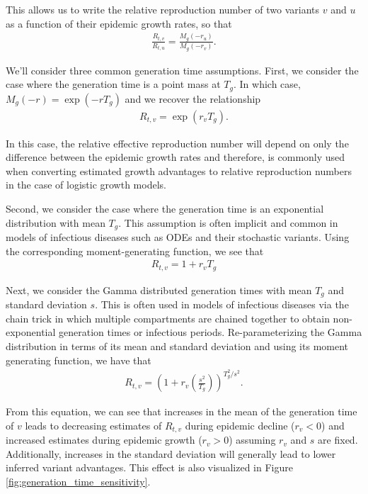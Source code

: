 \documentclass[11pt,oneside,letterpaper]{article}
\begin{document}
This allows us to write the relative reproduction number of two variants $v$ and $u$ as a function of their epidemic growth rates, so that
\begin{align*}
\frac{R_{t,v}}{R_{t,u}} = \frac{M_{g}(-r_{u})}{M_{g}(-r_{v})}.
\end{align*}

We'll consider three common generation time assumptions. First, we consider the case where the generation time is a point mass at $T_{g}$. In which case, $M_{g}(-r) = \exp(-r T_{g})$ and we recover the relationship
\begin{align*}
R_{t,v} = \exp(r_{v}T_{g}).
\end{align*}

In this case, the relative effective reproduction number will depend on only the difference between the epidemic growth rates and therefore, is commonly used when converting estimated growth advantages to relative reproduction numbers in the case of logistic growth models.

Second, we consider the case where the generation time is an exponential distribution with mean $T_{g}$. This assumption is often implicit and common in models of infectious diseases such as ODEs and their stochastic variants. Using the corresponding moment-generating function, we see that
\begin{align*}
R_{t,v} = 1 + r_{v} T_{g}
\end{align*}

Next, we consider the Gamma distributed generation times with mean $T_{g}$ and standard deviation $s$.
This is often used in models of infectious diseases via the chain trick in which multiple compartments are chained together to obtain non-exponential generation times or infectious periods.
Re-parameterizing the Gamma distribution in terms of its mean and standard deviation and using its moment generating function, we have that
\begin{align*}
R_{t,v} = \left(1 + r_{v}  \left(\frac{s^{2}}{T_{g}}\right) \right)^{T_{g}^{2} / s^{2}}.
\end{align*}

From this equation, we can see that increases in the mean of the generation time of $v$ leads to decreasing estimates of $R_{t,v}$ during epidemic decline ($r_{v} < 0$) and increased estimates during epidemic growth ($r_{v} > 0$) assuming $r_{v}$ and $s$ are fixed.
Additionally, increases in the standard deviation will generally lead to lower inferred variant advantages.
This effect is also visualized in Figure \ref{fig:generation_time_sensitivity}.
\end{document}
